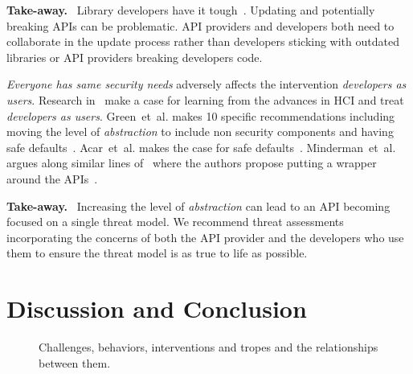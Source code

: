 \documentclass[conference]{IEEEtran}
\newenvironment{finding}{\begin{framed}\noindent\textbf{Take-away.}~}{\end{framed}}
\newcommand{\etal}[0]{et~al{.}}
\begin{document}
\begin{finding}
\noindent
Library developers have it tough~\cite{hartman2021nontechnical}. 
Updating and potentially breaking APIs can be problematic.
API providers and developers both need to collaborate in the update process rather than developers sticking with outdated libraries or API providers breaking developers code.  
\end{finding}

\emph{Everyone has same security needs} adversely affects the intervention \emph{developers as users}. Research in~\cite{rashid2019,acar2016} make a case for learning from the advances in \ac{HCI} and treat \emph{developers as users}. Green~\etal{} makes 10 specific recommendations including moving the level of \emph{abstraction} to include non security components and having safe defaults~\cite{smithgreen2016}. Acar~\etal{} makes the case for safe defaults~\cite{acarusability2017}. Minderman~\etal{} argues along similar lines of~\cite{smithgreen2016,acar2016} where the authors propose putting a wrapper around the APIs~\cite{mindermanrust2018}. 
\begin{finding}
\noindent  
Increasing the level of \emph{abstraction} can lead to an API becoming focused on a single  threat model. We recommend threat assessments incorporating the concerns of both the API provider and the developers who use them to ensure the threat model is as true to life as possible.
\end{finding}
%

\section{Discussion and Conclusion}
\begin{figure}
\centering
{}
\caption{Challenges, behaviors, interventions and tropes and the relationships between them.}
  \label{fig:circle}
\end{figure}
\end{document}
